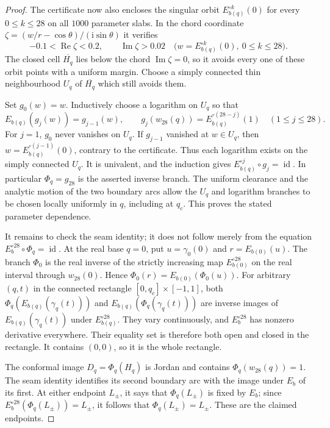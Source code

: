 \documentclass[11pt]{amsart}
\theoremstyle{definition}
\newcommand{\ii}{\mathrm{i}}
\begin{document}
\begin{proof}
The certificate  now also
encloses the singular orbit $E_{b(q)}^{\circ k}(0)$ for every
$0\le k\le28$ on all $1000$ parameter slabs.  In the chord
coordinate $\zeta=(w/r-\cos\theta)/(\ii\sin\theta)$ it verifies
\[
 -0.1<\operatorname{Re}\zeta<0.2,\qquad
 \operatorname{Im}\zeta>0.02
 \quad\bigl(w=E_{b(q)}^{\circ k}(0),\ 0\le k\le28\bigr).
\]
The closed cell $\overline{H_q}$ lies below the chord
$\operatorname{Im}\zeta=0$, so it avoids every one of these orbit
points with a uniform margin.  Choose a simply connected thin
neighbourhood $U_q$ of $\overline{H_q}$ which still avoids them.

Set $g_0(w)=w$.  Inductively choose a logarithm on $U_q$ so that
\[
 E_{b(q)}(g_j(w))=g_{j-1}(w),\qquad
 g_j(w_{28}(q))=E_{b(q)}^{\circ(28-j)}(1)
 \quad(1\le j\le28).
\]
For $j=1$, $g_0$ never vanishes on $U_q$.  If $g_{j-1}$ vanished at
$w\in U_q$, then $w=E_{b(q)}^{\circ(j-1)}(0)$, contrary to the
certificate.  Thus each logarithm exists on the simply connected
$U_q$.  It is univalent, and the induction gives
$E_{b(q)}^{\circ j}\circ g_j=\operatorname{id}$.  In particular
$\Phi_q=g_{28}$ is the asserted inverse branch.  The uniform
clearance and the analytic motion of the two boundary arcs allow the
$U_q$ and logarithm branches to be chosen locally uniformly in $q$,
including at $q_c$.  This proves the stated parameter dependence.

It remains to check the seam identity; it does not follow merely from
the equation $E_b^{\circ28}\circ\Phi_q=\operatorname{id}$.  At the
real base $q=0$, put $u=\gamma_0(0)$ and $r=E_{b(0)}(u)$.
The branch $\Phi_0$ is the real inverse of the strictly increasing
map $E_{b(0)}^{\circ28}$ on the real interval through $w_{28}(0)$.
Hence $\Phi_0(r)=E_{b(0)}(\Phi_0(u))$.
For arbitrary $(q,t)$ in the connected rectangle
$[0,q_c]\times[-1,1]$, both
$\Phi_q(E_{b(q)}(\gamma_q(t)))$ and
$E_{b(q)}(\Phi_q(\gamma_q(t)))$ are inverse images of
$E_{b(q)}(\gamma_q(t))$ under $E_{b(q)}^{\circ28}$.
They vary continuously, and $E_b^{\circ28}$ has nonzero derivative
everywhere.  Their equality set is therefore both open and closed
in the rectangle.  It contains $(0,0)$, so it is the whole rectangle.

The conformal image $D_q=\Phi_q(H_q)$ is Jordan and contains
$\Phi_q(w_{28}(q))=1$.  The seam identity identifies its second
boundary arc with the image under $E_b$ of its first.  At either
endpoint $L_\pm$, it says that $\Phi_q(L_\pm)$ is fixed by $E_b$;
since $E_b^{\circ28}(\Phi_q(L_\pm))=L_\pm$, it follows that
$\Phi_q(L_\pm)=L_\pm$.  These are the claimed endpoints.
\end{proof}
\end{document}
